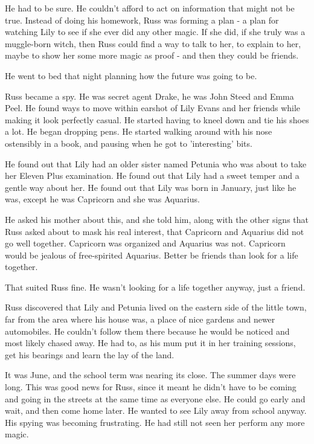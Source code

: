\documentclass[a4paper,11pt]{article}
\begin{document}
He had to be sure. He couldn't afford to act on information that might not be true. Instead of doing his homework, Russ was forming a plan - a plan for watching Lily to see if she ever did any other magic. If she did, if she truly was a muggle-born witch, then Russ could find a way to talk to her, to explain to her, maybe to show her some more magic as proof - and then they could be friends.

He went to bed that night planning how the future was going to be.

Russ became a spy. He was secret agent Drake, he was John Steed and Emma Peel. He found ways to move within earshot of Lily Evans and her friends while making it look perfectly casual. He started having to kneel down and tie his shoes a lot. He began dropping pens. He started walking around with his nose ostensibly in a book, and pausing when he got to 'interesting' bits.

He found out that Lily had an older sister named Petunia who was about to take her Eleven Plus examination. He found out that Lily had a sweet temper and a gentle way about her. He found out that Lily was born in January, just like he was, except he was Capricorn and she was Aquarius.

He asked his mother about this, and she told him, along with the other signs that Russ asked about to mask his real interest, that Capricorn and Aquarius did not go well together. Capricorn was organized and Aquarius was not. Capricorn would be jealous of free-spirited Aquarius. Better be friends than look for a life together.

That suited Russ fine. He wasn't looking for a life together anyway, just a friend.

Russ discovered that Lily and Petunia lived on the eastern side of the little town, far from the area where his house was, a place of nice gardens and newer automobiles. He couldn't follow them there because he would be noticed and most likely chased away. He had to, as his mum put it in her training sessions, get his bearings and learn the lay of the land.

It was June, and the school term was nearing its close. The summer days were long. This was good news for Russ, since it meant he didn't have to be coming and going in the streets at the same time as everyone else. He could go early and wait, and then come home later. He wanted to see Lily away from school anyway. His spying was becoming frustrating. He had still not seen her perform any more magic.
\end{document}
